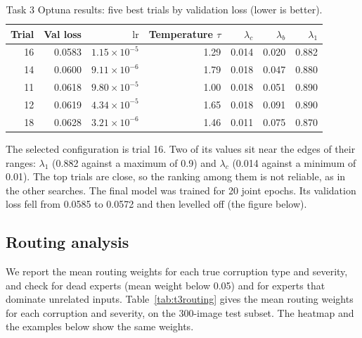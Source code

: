 \documentclass[conference]{IEEEtran}
\begin{document}
\begin{table}[t]
\centering
\caption{Task 3 Optuna results: five best trials by validation loss (lower is better).}
\label{tab:t3optuna}
\small
\begin{tabular}{@{}rrrrrrr@{}}
\toprule
Trial & Val loss & $\mathrm{lr}$ & Temperature $\tau$ & $\lambda_c$ & $\lambda_b$ & $\lambda_1$ \\
\midrule
16 & 0.0583 & $1.15\times10^{-5}$ & 1.29 & 0.014 & 0.020 & 0.882 \\
14 & 0.0600 & $9.11\times10^{-6}$ & 1.79 & 0.018 & 0.047 & 0.880 \\
11 & 0.0618 & $9.80\times10^{-5}$ & 1.00 & 0.018 & 0.051 & 0.890 \\
12 & 0.0619 & $4.34\times10^{-5}$ & 1.65 & 0.018 & 0.091 & 0.890 \\
18 & 0.0628 & $3.21\times10^{-6}$ & 1.46 & 0.011 & 0.075 & 0.870 \\
\bottomrule
\end{tabular}
\end{table}

The selected configuration is trial 16. Two of its values sit near the edges of their ranges: $\lambda_1$ (0.882
against a maximum of 0.9) and $\lambda_c$ (0.014 against a minimum of 0.01). The top trials are close, so the
ranking among them is not reliable, as in the other searches. The final model was trained for 20 joint epochs.
Its validation loss fell from 0.0585 to 0.0572 and then levelled off (the figure below).

\subsection{Routing analysis}
We report the mean routing weights for each true corruption type and severity, and check for dead
experts (mean weight below 0.05) and for experts that dominate unrelated inputs. Table~\ref{tab:t3routing} gives the mean routing weights for each corruption and severity, on the 300-image test
subset. The heatmap and the examples below show the same weights.
\end{document}
